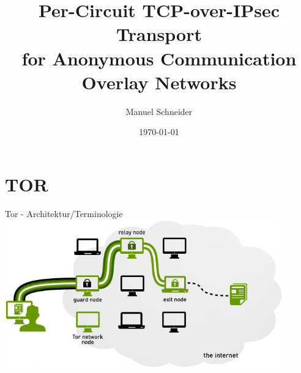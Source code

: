 \documentclass{beamer}
\title{Per-Circuit TCP-over-IPsec Transport\\for Anonymous Communication Overlay Networks}
\author{Manuel Schneider}
\institute{Albert Ludwigs Universität - Institut für Informatik}
\date{\today}
\begin{document}

\begin{frame}[plain]
  \titlepage
\end{frame}



\section{TOR}

\begin{frame}{Tor - Architektur/Terminologie}
   \includegraphics[width=0.9\textwidth]{pics/tor}
\end{frame}
\end{document}
